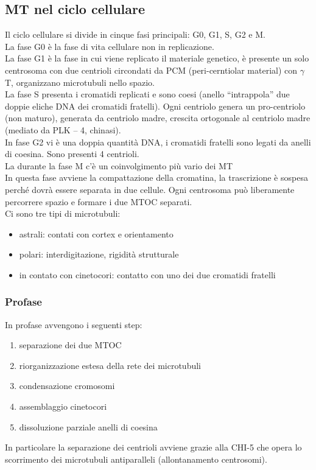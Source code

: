     \subsection{MT nel ciclo cellulare}
        Il ciclo cellulare si divide in cinque fasi principali: G0, G1, S, G2 e M.\\
        La fase G0 è la fase di vita cellulare non in replicazione. \\
        La fase G1 è la fase in cui viene replicato il materiale genetico, è presente un solo centrosoma con due centrioli circondati da PCM (peri-cerntiolar material) con $\gamma$T, organizzano microtubuli nello spazio.\\
        La fase S presenta i cromatidi replicati e sono coesi (anello “intrappola” due doppie eliche DNA dei cromatidi fratelli).
        Ogni centriolo genera un pro-centriolo (non maturo), generata da centriolo madre, crescita ortogonale al centriolo madre (mediato da PLK – 4, chinasi).\\
        In fase G2 vi è una doppia quantità DNA, i cromatidi fratelli sono legati da anelli di coesina. Sono presenti 4 centrioli.\\
        
        La durante la fase M c'è un coinvolgimento più vario dei MT\\	In questa fase avviene la compattazione della cromatina, la trascrizione è sospesa perché dovrà essere separata in due cellule. Ogni centrosoma può liberamente percorrere spazio e formare i due MTOC separati. \\
        Ci sono tre tipi di microtubuli:
        \begin{itemize}
            \item astrali: contati con cortex e orientamento
            \item polari: interdigitazione, rigidità strutturale
            \item in contato con cinetocori: contatto con uno dei due cromatidi fratelli
        \end{itemize}
        
        \subsubsection{Profase}
            In profase avvengono i seguenti step:
            \begin{enumerate}
                \item separazione dei due MTOC
                \item riorganizzazione estesa della rete dei microtubuli
                \item condensazione cromosomi
                \item assemblaggio cinetocori
                \item dissoluzione parziale anelli di coesina
            \end{enumerate}
            In particolare la separazione dei centrioli avviene grazie alla CHI-5 che opera lo scorrimento dei microtubuli antiparalleli (allontanamento centrosomi).
            
